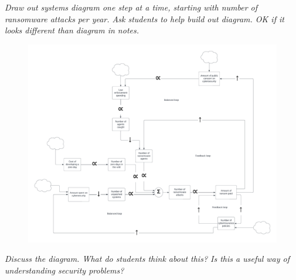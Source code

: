 \documentclass[11pt]{article}
\begin{document}
{\it Draw out systems diagram one step at a time, starting with number of ransomware attacks per year. Ask students to help build out diagram. OK if it looks different than diagram in notes.}

\begin{figure}[h]
    \includegraphics*[width=\textwidth]{ransomware-sys-diagram.pdf}
\end{figure}


{\it Discuss the diagram. What do students think about this? Is this a useful way of understanding security problems?}
\end{document}
